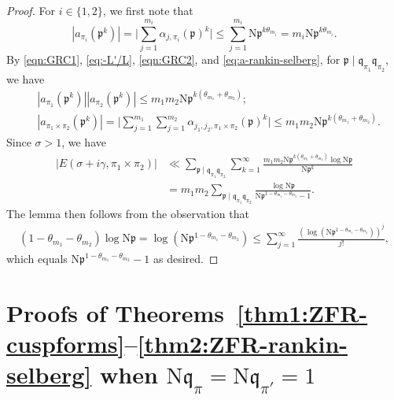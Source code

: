 \documentclass[12pt,reqno]{amsart}
\theoremstyle{remark}
\newcommand{\N}{\mathrm{N}}
\newcommand{\kp}{\mathfrak{p}}
\newcommand{\kq}{\mathfrak{q}}
\numberwithin{equation}{section}
\begin{document}
	\begin{proof}
		For $i \in \{1,2\}$, we first note that 
		\begin{equation*}\label{eq:localroot}
			|a_{\pi_i}(\kp^k)| = \Big|\sum_{j=1}^{m_i} \alpha_{j,\pi_i}(\kp)^k \Big| \le \sum_{j=1}^{m_i} \N\kp^{k\theta_{m_i}} = m_i\N\kp^{k\theta_{m_i}}.
		\end{equation*}
		By \eqref{eqn:GRC1}, \eqref{eq:-L'/L},  \eqref{eqn:GRC2}, and \eqref{eq:a-rankin-selberg}, for $\kp  \mid \kq_{\pi_1}\kq_{\pi_2}$, we have
		\begin{equation*}\label{eq:localroot2}
        \begin{aligned}
        & |a_{\pi_1}(\kp^k)||a_{\pi_2}(\kp^k)| \le m_1m_2\N\kp^{k(\theta_{m_1}+\theta_{m_2})}; \\
        &|a_{\pi_1 \times \pi_2}(\kp^k)| =\Big|\sum_{j=1}^{m_1}\sum_{j=1}^{m_2} \alpha_{j_1,j_2, \pi_1 \times \pi_2}(\kp)^k\Big|  \le m_1m_2 \N\kp^{k(\theta_{m_1}+\theta_{m_2})}.
         \end{aligned}
		\end{equation*}
		Since $\sigma>1$, we have 
		\begin{equation*}\label{eq:error}
			\begin{aligned}
				|E(\sigma+ i\gamma, \pi_1 \times \pi_2)|
				&\ll  \sum_{\kp  \mid \kq_{\pi_1}\kq_{\pi_2}} \sum_{k=1}^{\infty} \frac{m_1m_2
                \N\kp^{k(\theta_{m_1}+\theta_{m_2})}\log \N\kp}{\N\kp^{k}} \\
                &=  m_1m_2\sum_{\kp  \mid \kq_{\pi_1}\kq_{\pi_2}}\frac{\log \N\kp}{\N\kp^{1-\theta_{m_1}-\theta_{m_2}}-1}.
			\end{aligned}
		\end{equation*}
        The lemma then follows from the observation that
	\begin{equation*}
			\begin{aligned}
		(1-\theta_{m_1}-\theta_{m_2})\log \N\kp =\log(\N\kp^{1-\theta_{m_1}-\theta_{m_2}})
        \leq \sum_{j=1}^{\infty}\frac{(\log(\N\kp^{1-\theta_{m_1} -\theta_{m_2}}))^{j}}{j!},
		\end{aligned} 
		\end{equation*} 
        which equals $\N\kp^{1-\theta_{m_1}-\theta_{m_2}}-1$ as desired. 
	\end{proof}
	
	
	
	\section{Proofs of Theorems~\ref{thm1:ZFR-cuspforms}--\ref{thm2:ZFR-rankin-selberg} when \texorpdfstring{$\N\kq_{\pi}=\N\kq_{\pi'} = 1$}{N1}}\label{sec:proof-level1}
\end{document}
